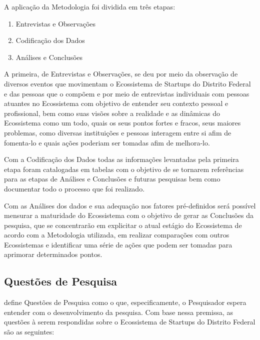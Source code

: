 A aplicação da Metodologia foi dividida em três etapas:

\begin{enumerate}
  \item Entrevistas e Observações
  \item Codificação dos Dados
  \item Análises e Conclusões
\end{enumerate}

A primeira, de Entrevistas e Observações, se deu por meio da observação de diversos eventos que movimentam o Ecossistema de Startups do Distrito Federal e das pessoas que o compõem e por meio de entrevistas individuais com pessoas atuantes no Ecossistema com objetivo de entender seu contexto pessoal e profissional, bem como suas visões sobre a realidade e as dinâmicas do Ecossistema como um todo, quais os seus pontos fortes e fracos, seus maiores problemas, como diversas instituições e pessoas interagem entre si afim de fomenta-lo e quais ações poderiam ser tomadas afim de melhora-lo.

Com a Codificação dos Dados todas as informações levantadas pela primeira etapa foram catalogadas em tabelas com o objetivo de se tornarem referências para as etapas de Análises e Conclusões e futuras pesquisas bem como documentar todo o processo que foi realizado. 

Com as Análises dos dados e sua adequação nos fatores pré-definidos será possível mensurar a maturidade do Ecossistema com o objetivo de gerar as Conclusões da pesquisa, que se concentrarão em explicitar o atual estágio do Ecossistema de acordo com a Metodologia utilizada, em realizar comparações com outros Ecossistemas e identificar uma série de ações que podem ser tomadas para aprimorar determinados pontos.

\subsection{Questões de Pesquisa}
\label{subsection:questoes_de_pesquisa}

 define Questões de Pesquisa como o que, especificamente, o Pesquisador espera entender com o desenvolvimento da pesquisa. Com base nessa premissa, as questões à serem respondidas sobre o Ecossistema de Startups do Distrito Federal são as seguintes:

